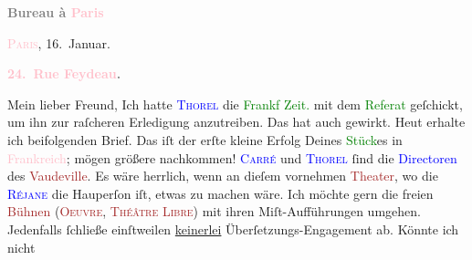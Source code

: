            \pstart
           \begin{otherlanguage}{french}\textcolor{gray}{\textbf{\textbf{Bureau à \textcolor{pink}{Paris}{}\ledrightnote{\textcolor{pink}{Paris}}}}}\end{otherlanguage}\hfill \textsc{\textcolor{pink}{Paris}{}\ledrightnote{\textcolor{pink}{Paris}}}, 16. Januar.\pend
           \pstart
           \begin{otherlanguage}{french}\textcolor{gray}{\textbf{\textbf{\textcolor{pink}{24. Rue Feydeau}{}\ledrightnote{\textcolor{pink}{rue Feydeau}}.}}}\end{otherlanguage}\pend
           \pstart\center{}Mein lieber Freund,\pend\pstart
           Ich hatte \textsc{\textcolor{blue}{Thorel}{}\ledrightnote{\textcolor{blue}{Jean Thorel}}} die \textcolor{green}{Frankf Zeit.}{}\ledrightnote{\textcolor{green}{Frankfurter Zeitung}} mit dem \textcolor{green}{Referat}{} geſchickt, um ihn zur raſcheren
               Erledigung anzutreiben. Das hat auch gewirkt. Heut
               erhalte ich beifolgenden Brief. Das iſt der erſte kleine Erfolg Deines \textcolor{green}{Stück}{}es in \textcolor{pink}{Frankreich}{}\ledrightnote{\textcolor{pink}{Frankreich}}; mögen größere nachkommen! \textsc{\textcolor{blue}{Carré}{}\ledrightnote{\textcolor{blue}{Albert Carré}}} und \textsc{\textcolor{blue}{Thorel}{}\ledrightnote{\textcolor{blue}{Jean Thorel}}} ſind die \textcolor{blue}{Directoren}{} des \textcolor{brown}{Vaudeville}{}\ledrightnote{\textcolor{brown}{Théâtre du Vaudeville}}. Es wäre
               herrlich, wenn an dieſem vornehmen \textcolor{brown}{Theater}{}, wo die \textsc{\textcolor{blue}{Réjane}{}\ledrightnote{\textcolor{blue}{Réjane}}} die Hauperſon iſt, etwas {\pb}zu machen wäre. Ich
               möchte gern  die freien \textcolor{brown}{Bühnen}{} (\textsc{\textcolor{brown}{Oeuvre}{}\ledrightnote{\textcolor{brown}{Théâtre de l’Œuvre}}}, \textsc{\textcolor{brown}{Théâtre Libre}{}\ledrightnote{\textcolor{brown}{Théâtre Libre}}}) mit ihren Miſt-Aufführungen umgehen. Jedenfalls ſchließe einſtweilen \uline{keinerlei} Überſetzungs-Engagement ab. Könnte ich nicht
